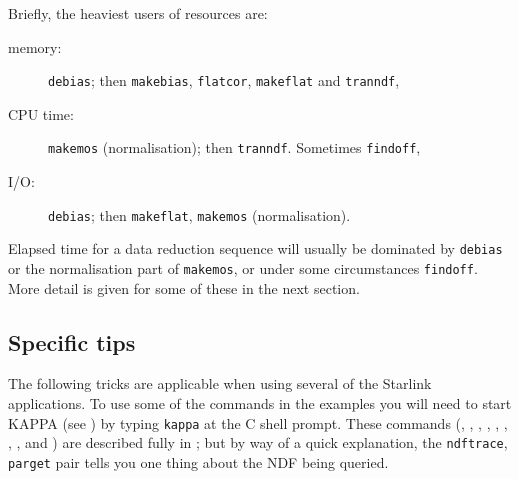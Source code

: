 \documentclass[twoside,11pt]{starlink}
\begin{document}
Briefly, the heaviest users of resources are:

\begin{description}

  \item[memory:] \texttt{debias}; then \texttt{makebias}, \texttt{flatcor},
   \texttt{makeflat} and \texttt{tranndf},

  \item[CPU time:] \texttt{makemos} (normalisation); then \texttt{tranndf}.
   Sometimes \texttt{findoff},

  \item[I/O:] \texttt{debias}; then \texttt{makeflat}, \texttt{makemos}
   (normalisation).

\end{description}

Elapsed time for a data reduction sequence will usually be dominated by
\texttt{debias} or the normalisation part of \texttt{makemos}, or under some
circumstances \texttt{findoff}.
More detail is given for some of these in the next section.

\subsection{Specific tips}

The following tricks are applicable when using several of the
Starlink applications.
To use some of the commands in the examples you will need to start KAPPA
(see \/\cite{SUN95}) by typing \texttt{kappa} at the
C shell prompt.
These commands
(,
,
,
,
,
,
,
,
 and
)
are described fully in ; but by way of a quick
explanation, the \texttt{ndftrace}, \texttt{parget} pair tells you one thing
about the NDF being queried.
\end{document}
